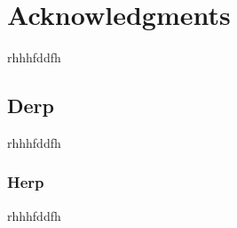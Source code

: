 \documentclass[../../web server admin.tex]{subfiles}
\begin{document}
	
	\chapter*{Acknowledgments}
	rhhhfddfh
	
	\section*{Derp}
	rhhhfddfh
	
	\subsection*{Herp}
	rhhhfddfh
	
\end{document}

